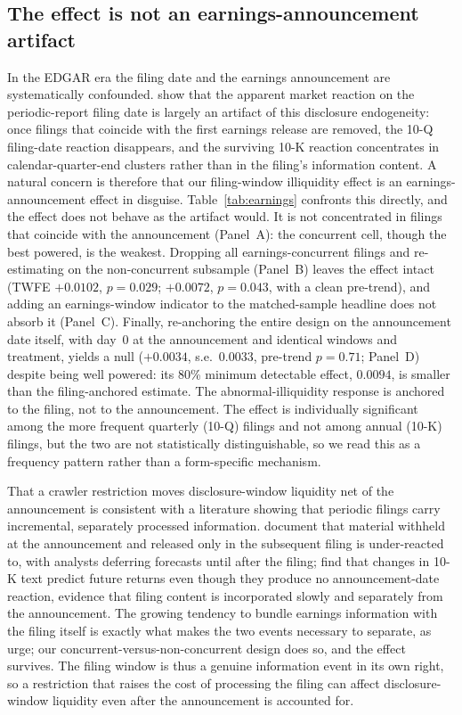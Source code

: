 \documentclass[12pt]{article}
\begin{document}
\subsection{The effect is not an earnings-announcement artifact}\label{app:earnings}
In the EDGAR era the filing date and the earnings announcement are systematically confounded. \citet{LiRamesh2009} show that the apparent market reaction on the periodic-report filing date is largely an artifact of this disclosure endogeneity: once filings that coincide with the first earnings release are removed, the 10-Q filing-date reaction disappears, and the surviving 10-K reaction concentrates in calendar-quarter-end clusters rather than in the filing's information content. A natural concern is therefore that our filing-window illiquidity effect is an earnings-announcement effect in disguise. Table~\ref{tab:earnings} confronts this directly, and the effect does not behave as the artifact would. It is not concentrated in filings that coincide with the announcement (Panel~A): the concurrent cell, though the best powered, is the weakest. Dropping all earnings-concurrent filings and re-estimating on the non-concurrent subsample (Panel~B) leaves the effect intact (TWFE $+0.0102$, $p=0.029$; \citet{BorusyakJaravelSpiess2024} $+0.0072$, $p=0.043$, with a clean pre-trend), and adding an earnings-window indicator to the matched-sample headline does not absorb it (Panel~C). Finally, re-anchoring the entire design on the announcement date itself, with day~0 at the announcement and identical windows and treatment, yields a null ($+0.0034$, s.e.\ $0.0033$, pre-trend $p=0.71$; Panel~D) despite being well powered: its 80\% minimum detectable effect, $0.0094$, is smaller than the filing-anchored estimate. The abnormal-illiquidity response is anchored to the filing, not to the announcement. The effect is individually significant among the more frequent quarterly (10-Q) filings and not among annual (10-K) filings, but the two are not statistically distinguishable, so we read this as a frequency pattern rather than a form-specific mechanism.

That a crawler restriction moves disclosure-window liquidity net of the announcement is consistent with a literature showing that periodic filings carry incremental, separately processed information. \citet{LiNekrasovTeoh2020} document that material withheld at the announcement and released only in the subsequent filing is under-reacted to, with analysts deferring forecasts until after the filing; \citet{CohenMalloyNguyen2020} find that changes in 10-K text predict future returns even though they produce no announcement-date reaction, evidence that filing content is incorporated slowly and separately from the announcement. The growing tendency to bundle earnings information with the filing itself \citep{ArifMarshallSchroederYohn2019} is exactly what makes the two events necessary to separate, as \citet{LiRamesh2009} urge; our concurrent-versus-non-concurrent design does so, and the effect survives. The filing window is thus a genuine information event in its own right, so a restriction that raises the cost of processing the filing can affect disclosure-window liquidity even after the announcement is accounted for.
\end{document}

